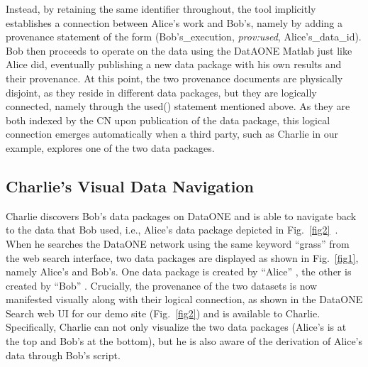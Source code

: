 \documentclass[a4paper]{llncs}
\newcommand{\authornote}[2] {
    \begin{center}
        \framebox{
            {\begin{minipage}[t]{0.9\linewidth}
                \color{red}
                \raggedright  \textbf{[#1]}~ \scriptsize #2 \normalsize
            \end{minipage}}
    }
    \end{center}
}
\begin{document}
Instead, by retaining the same identifier throughout, the tool implicitly establishes a connection between Alice's work and Bob's, namely by adding a provenance statement of the form (Bob's\_execution, \emph{prov:used}, Alice's\_data\_id).
Bob then proceeds to operate on the data using the DatAONE Matlab just like Alice did, eventually publishing a new data package with his own results and their provenance.
At this point, the two provenance documents are physically disjoint, as they reside in different data packages, but they are logically connected, namely through the used() statement mentioned above.
As they are both indexed by the CN upon publication of the data package, this logical connection emerges automatically when a third party, such as Charlie in our example, explores one of the two data packages.


\subsection{Charlie's Visual Data Navigation}


Charlie discovers Bob's data packages on DataONE and is able to navigate back to the data that Bob used, i.e., Alice's data package depicted in Fig.~\ref{fig2}~\cite{Katz,data-trajectories}. When he searches the DataONE network using the same keyword ``grass'' from the web search interface, two data packages are displayed as shown in Fig.~\ref{fig1}, namely Alice's and Bob's. 
One data package is created by ``Alice'' \cite{yaxing}, the other is created by ``Bob'' \cite{christopher}. 
%
Crucially, the provenance of the two datasets is now manifested visually along with their logical connection, as shown in the DataONE Search web UI for our demo site \cite{dataone-demo} (Fig.~\ref{fig2}) and is available to Charlie.
%
Specifically, Charlie can not only visualize the two data packages (Alice's is at the top and Bob's at the bottom), but he  is also aware of the derivation of Alice's data through Bob's script.
%
\end{document}
